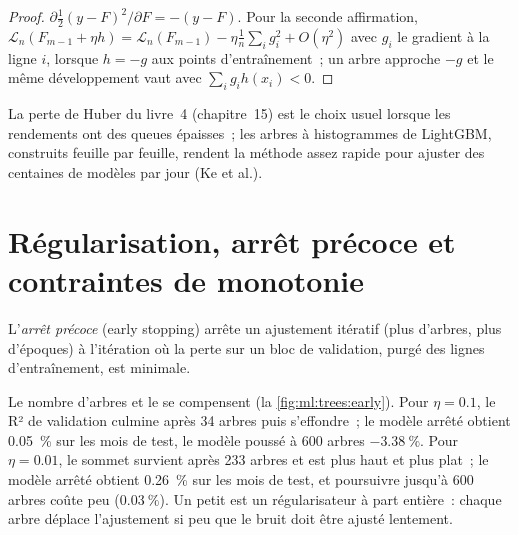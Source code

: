 \begin{proof}
$\partial\frac12(y - F)^2/\partial F = -(y - F)$. Pour la seconde affirmation, $\mathcal L_n(F_{m-1} + \eta h) =
\mathcal L_n(F_{m-1}) - \eta\frac1n\sum_ig_i^2 + O(\eta^2)$ avec $g_i$ le gradient à la ligne $i$, lorsque $h = -g$ aux
points d'entraînement~; un arbre approche $-g$ et le même développement vaut avec $\sum_ig_ih(x_i) < 0$.
\end{proof}

La perte de Huber du livre~4 (chapitre~15) est le choix usuel lorsque les rendements ont des queues épaisses~; les arbres à histogrammes de LightGBM,
construits feuille par feuille, rendent la méthode assez rapide pour ajuster des centaines de modèles par jour (Ke et al.).

\section{Régularisation, arrêt précoce et contraintes de monotonie}

\begin{definition}\label{def:ml:trees-and-boosting:early}
L'\emph{arrêt précoce} (early stopping) arrête un ajustement itératif (plus d'arbres, plus d'époques) à l'itération où la
perte sur un bloc de validation, purgé des lignes d'entraînement, est minimale.
\end{definition}

Le nombre d'arbres et le  se compensent (la \cref{fig:ml:trees:early}). Pour $\eta = 0.1$, le
R² de validation culmine après 34 arbres puis s'effondre~; le modèle arrêté obtient 0.05~\% sur les mois de test,
le modèle poussé à 600 arbres $-3.38~\%$. Pour $\eta = 0.01$, le sommet survient après 233 arbres et est plus haut et plus plat~; le
modèle arrêté obtient 0.26~\% sur les mois de test, et poursuivre jusqu'à 600 arbres coûte peu ($0.03~\%$). Un petit 
est un régularisateur à part entière~: chaque arbre déplace l'ajustement si peu que le bruit doit être ajusté lentement.

